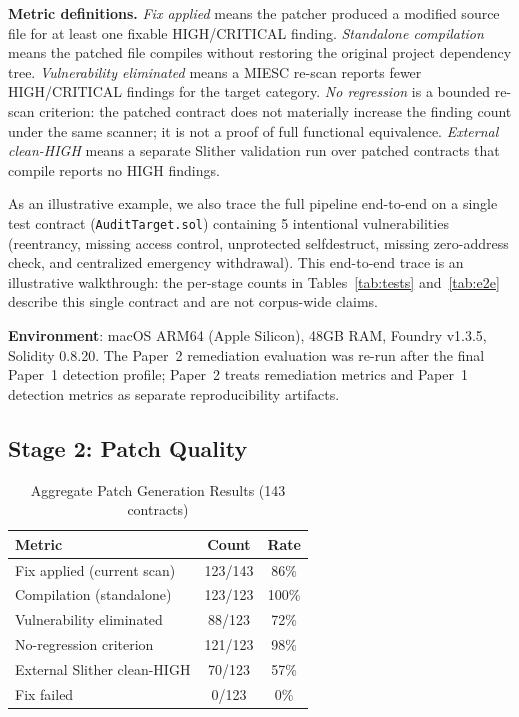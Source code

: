 \documentclass[conference]{IEEEtran}
\begin{document}
\textbf{Metric definitions.} \emph{Fix applied} means the patcher produced a modified source file for at least one fixable HIGH/CRITICAL finding. \emph{Standalone compilation} means the patched file compiles without restoring the original project dependency tree. \emph{Vulnerability eliminated} means a MIESC re-scan reports fewer HIGH/CRITICAL findings for the target category. \emph{No regression} is a bounded re-scan criterion: the patched contract does not materially increase the finding count under the same scanner; it is not a proof of full functional equivalence. \emph{External clean-HIGH} means a separate Slither validation run over patched contracts that compile reports no HIGH findings.

As an illustrative example, we also trace the full pipeline end-to-end on a single test contract (\texttt{AuditTarget.sol}) containing 5 intentional vulnerabilities (reentrancy, missing access control, unprotected selfdestruct, missing zero-address check, and centralized emergency withdrawal). This end-to-end trace is an illustrative walkthrough: the per-stage counts in Tables~\ref{tab:tests} and~\ref{tab:e2e} describe this single contract and are not corpus-wide claims.

\textbf{Environment}: macOS ARM64 (Apple Silicon), 48GB RAM, Foundry v1.3.5, Solidity 0.8.20. The Paper~2 remediation evaluation was re-run after the final Paper~1 detection profile; Paper~2 treats remediation metrics and Paper~1 detection metrics as separate reproducibility artifacts.

\subsection{Stage 2: Patch Quality}

\begin{table}[htbp]
\caption{Aggregate Patch Generation Results (143 contracts)}
\label{tab:fix}
\centering
\begin{tabular}{@{}lcc@{}}
\toprule
\textbf{Metric} & \textbf{Count} & \textbf{Rate} \\
\midrule
Fix applied (current scan) & 123/143 & 86\% \\
Compilation (standalone) & 123/123 & 100\% \\
Vulnerability eliminated & 88/123 & 72\% \\
No-regression criterion & 121/123 & 98\% \\
External Slither clean-HIGH & 70/123 & 57\% \\
Fix failed & 0/123 & 0\% \\
\bottomrule
\end{tabular}
\end{table}
\end{document}

